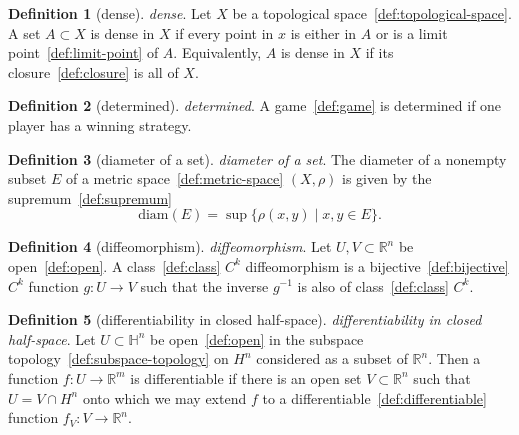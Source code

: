 \documentclass[12pt,a4paper]{article}
\theoremstyle{definition}
\newtheorem{definition}{Definition}
\begin{document}
\begin{definition}[dense]\label{def:dense}
\emph{dense}. Let $X$ be a topological space~\ref{def:topological-space}. A set $A \subset X$ is dense in $X$ if every point in $x$ is either in $A$ or is a limit point~\ref{def:limit-point} of $A$. Equivalently, $A$ is dense in $X$ if its closure~\ref{def:closure} is all of $X$.
\end{definition}

\begin{definition}[determined]\label{def:determined}
\emph{determined}. A game~\ref{def:game} is determined if one player has a winning strategy.
\end{definition}

\begin{definition}[diameter of a set]\label{def:diameter-of-a-set}
\emph{diameter of a set}. The diameter of a nonempty subset $E$ of a metric space~\ref{def:metric-space} $(X,\rho)$ is given by the supremum~\ref{def:supremum} $$\text{diam}(E) = \sup\{\rho(x,y)\mid x,y \in E\}.$$
\end{definition}

\begin{definition}[diffeomorphism]\label{def:diffeomorphism}
\emph{diffeomorphism}. Let $U,V\subset\mathbb R^n$ be open~\ref{def:open}. A class~\ref{def:class} $C^k$ diffeomorphism is a bijective~\ref{def:bijective} $C^k$ function $g:U\to V$ such that the inverse $g^{-1}$ is also of class~\ref{def:class} $C^k$.
\end{definition}

\begin{definition}[differentiability in closed half-space]\label{def:differentiability-in-closed-half-space}
\emph{differentiability in closed half-space}. Let $U\subset\mathbb H^n$ be open~\ref{def:open} in the subspace topology~\ref{def:subspace-topology} on $H^n$ considered as a subset of $\mathbb R^n$. Then a function $f:U\to\mathbb R^m$ is differentiable if there is an open set $V \subset\mathbb R^n$ such that $U = V\cap H^n$ onto which we may extend $f$ to a differentiable~\ref{def:differentiable} function $f_V:V\to\mathbb R^n$.
\end{definition}
\end{document}
